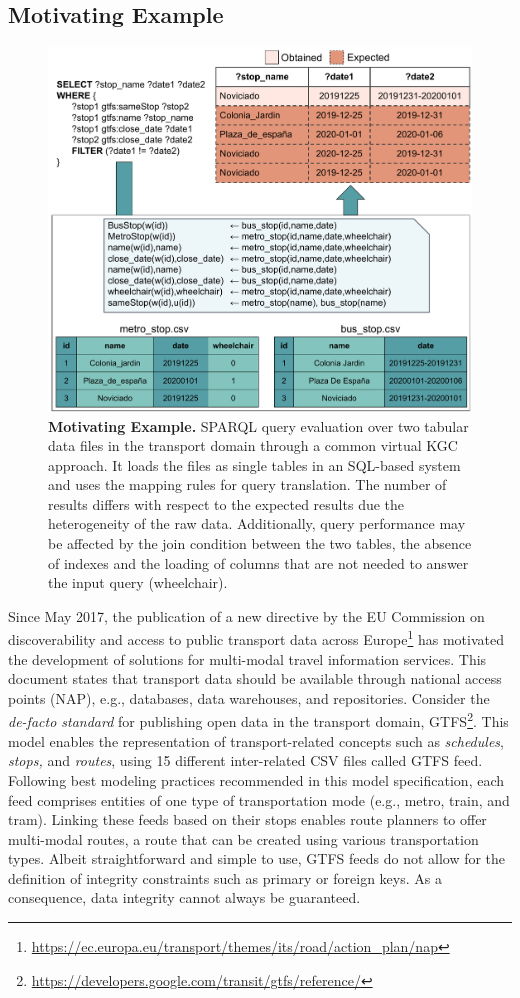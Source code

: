 \subsection{Motivating Example}
\begin{figure}[ht]
    \centering
    \includegraphics[width=0.6\linewidth]{figures/example.pdf}
    \caption[Morph-CSV motivating example]{\textbf{Motivating Example.} SPARQL query evaluation over two tabular data files in the transport domain through a common virtual KGC approach. It loads the files as single tables in an SQL-based system and uses the mapping rules for query translation. The number of results differs with respect to the expected results due the heterogeneity of the raw data. Additionally, query performance may be affected by the join condition between the two tables, the absence of indexes and the loading of columns that are not needed to answer the input query (wheelchair).}
    \label{fig:example}
\end{figure}
Since May 2017, the publication of a new directive by the EU Commission on discoverability and access to public transport data across Europe\footnote{\url{https://ec.europa.eu/transport/themes/its/road/action_plan/nap}} has motivated the development of solutions for multi-modal travel information services. This document states that transport data should be available through national access points (NAP), e.g., databases, data warehouses, and repositories. Consider the \emph{de-facto standard} for publishing open data in the transport domain, GTFS\footnote{\url{https://developers.google.com/transit/gtfs/reference/}}. This model enables the representation of transport-related concepts such as \textit{schedules}, \textit{stops,} and \textit{routes}, using 15 different inter-related CSV files called GTFS feed. Following best modeling practices recommended in this model specification, each feed comprises entities of one type of transportation mode (e.g., metro, train, and tram). Linking these feeds based on their stops enables route planners to offer multi-modal routes, a route that can be created using various transportation types.
Albeit straightforward and simple to use, GTFS feeds do not allow for the definition of integrity constraints such as primary or foreign keys. As a consequence, data integrity cannot always be guaranteed. 

